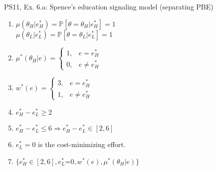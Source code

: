\begin{frame}{PS11, Ex. 6.a: Spence’s education signaling model (separating PBE)}
\begin{multicols}{2}
\begin{enumerate}
        \item $\mu\left(\theta_H|e_H^*\right)=
               \mathbb{P}\left[\theta=\theta_H|e_H^*\right]=1$\\
              $\mu\left(\theta_L|e_L^*\right)=
               \mathbb{P}\left[\theta=\theta_L|e_L^*\right]=1$
        \item $\mu^*(\theta_H|e)=\left\{\begin{array}{ll}
                  1, & e = e_H^* \\
                  0, & e \neq e_H^*
               \end{array}\right.$
        \item $w^*(e)=\left\{\begin{array}{ll}
                  3, & e = e_H^* \\
                  1, & e \neq e_H^*
               \end{array}\right.$
        \item $e_H^*-e_L^*\geq2$
        \item $e_H^*-e_L^*\leq6\Rightarrow e_H^*-e_L^*\in[2,6]$
        \item $e_L^*=0$ is the cost-minimizing effort.
        \item $\{e_H^*\in[2,6],e_L^*$=$0,w^*(e),\mu^*(\theta_H|e)\}$
      \end{enumerate}
      \vfill\null
    \end{multicols}
\end{frame}
